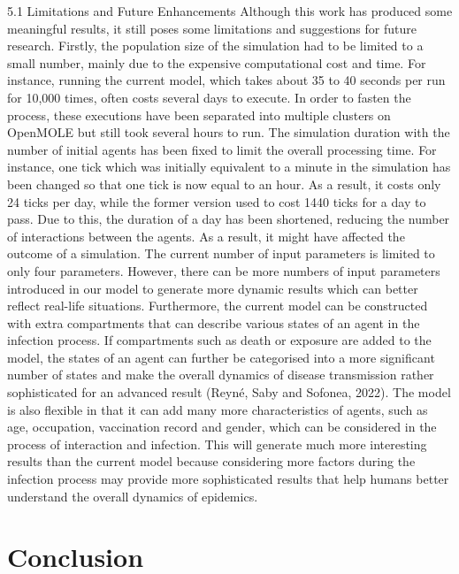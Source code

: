\documentclass[smallextended]{svjour3}       %
\begin{document}
5.1 Limitations and Future Enhancements
Although this work has produced some meaningful results, it still poses some limitations and suggestions for future research. Firstly, the population size of the simulation had to be limited to a small number, mainly due to the expensive computational cost and time. For instance, running the current model, which takes about 35 to 40 seconds per run for 10,000 times, often costs several days to execute. In order to fasten the process, these executions have been separated into multiple clusters on OpenMOLE but still took several hours to run. The simulation duration with the number of initial agents has been fixed to limit the overall processing time. For instance, one tick which was initially equivalent to a minute in the simulation has been changed so that one tick is now equal to an hour. As a result, it costs only 24 ticks per day, while the former version used to cost 1440 ticks for a day to pass. Due to this, the duration of a day has been shortened, reducing the number of interactions between the agents. As a result, it might have affected the outcome of a simulation.
The current number of input parameters is limited to only four parameters. However, there can be more numbers of input parameters introduced in our model to generate more dynamic results which can better reflect real-life situations. Furthermore, the current model can be constructed with extra compartments that can describe various states of an agent in the infection process. If compartments such as death or exposure are added to the model, the states of an agent can further be categorised into a more significant number of states and make the overall dynamics of disease transmission rather sophisticated for an advanced result (Reyné, Saby and Sofonea, 2022). The model is also flexible in that it can add many more characteristics of agents, such as age, occupation, vaccination record and gender, which can be considered in the process of interaction and infection. This will generate much more interesting results than the current model because considering more factors during the infection process may provide more sophisticated results that help humans better understand the overall dynamics of epidemics.



\section{Conclusion}
\end{document}

